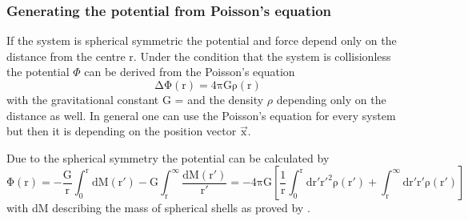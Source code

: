\subsubsection{Generating the potential from Poisson's equation}\label{sec:poisson}
If the system is spherical symmetric the potential and force depend only on the distance from the centre r. Under the condition that the system is collisionless the potential \(\Phi\) can be derived from the Poisson's equation \begin{equation}\label{eq:Poisson}
\mathrm{\Delta\Phi(r)=4\pi G \rho(r)}
\end{equation}
with the gravitational constant G =  \citep{2015arXiv150707956M} and the density \(\rho\) depending only on the distance as well. In general one can use the Poisson's equation for every system but then it is depending on the position vector \(\vec{\mathrm{x}}\). 
\par Due to the spherical symmetry the potential can be calculated by 
\begin{equation}\label{eq:numerical_poisson}
\mathrm{\Phi(r)=-\frac{G}{r}\int_0^r{\mathrm{d}M(r')}-G\int_r^{\infty}{\frac{\mathrm{d}M(r')}{r'}}=-4\pi G\left[\frac{1}{r}\int_0^r\mathrm{d}r'r'^2\rho(r')+\int_r^{\infty}\mathrm{d}r'r'\rho(r')\right]}
\end{equation} with dM describing the mass of spherical shells as proved by \citet[eq. 2.28]{2008gady.book.....B}. 
